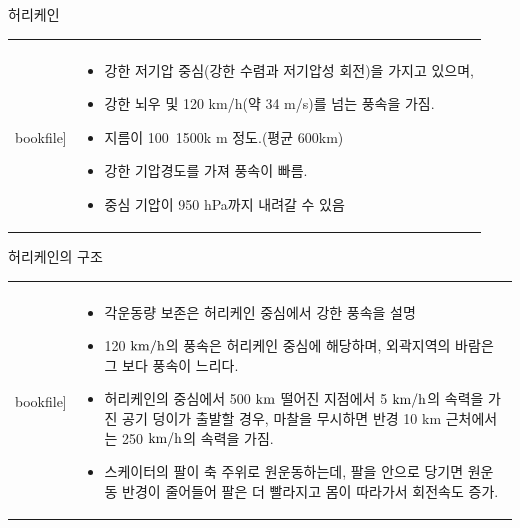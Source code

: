 \begin{frame}[t]{허리케인}
	\begin{tabular}{ll}
		\begin{minipage}[t]{0.5\textwidth}\scriptsize
			\begin{figure}[t]
				\texttt{[image: \\bookfile]}
			\end{figure}
		\end{minipage}	
		&
		\begin{minipage}[t]{0.45\textwidth} \scriptsize	

			\begin{itemize}
				\item 강한 저기압 중심(강한 수렴과 저기압성 회전)을 가지고 있으며, 
				\item 강한 뇌우 및 120 km/h(약 34 m/s)를 넘는 풍속을 가짐.
				\item 지름이 100~1500k m 정도.(평균 600km)
				\item 강한 기압경도를 가져 풍속이 빠름.
				\item 중심 기압이 950 hPa까지 내려갈 수 있음
			\end{itemize}

		\end{minipage}
	\end{tabular}
\end{frame}


\begin{frame}[t]{허리케인의 구조}
	\begin{tabular}{ll}
		\begin{minipage}[t]{0.3\textwidth}\scriptsize
			\begin{figure}[t]
				\texttt{[image: \\bookfile]}
			\end{figure}
		\end{minipage}	
		&
		\begin{minipage}[t]{0.65\textwidth} \scriptsize	
			
			\begin{itemize}
				\item 각운동량 보존은 허리케인 중심에서 강한 풍속을 설명
				\item 120 $\rm{km/h}$의 풍속은 허리케인 중심에 해당하며, 외곽지역의 바람은 그 보다 풍속이 느리다. 
				\item 허리케인의 중심에서 500 $\rm{km}$ 떨어진 지점에서 5 $\rm{km/h}$의 속력을 가진 공기 덩이가 출발할 경우, 마찰을 무시하면 반경 10 km 근처에서는 250 $\rm{km/h}$의 속력을 가짐.
				\item 스케이터의 팔이 축 주위로 원운동하는데, 팔을 안으로 당기면 원운동 반경이 줄어들어 팔은 더 빨라지고 몸이 따라가서 회전속도 증가.
			\end{itemize}

		\end{minipage}
	\end{tabular}
\end{frame}



